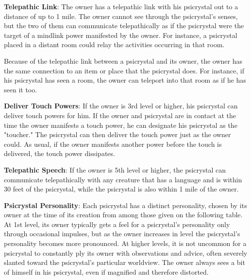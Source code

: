 \textbf{Telepathic Link}: The owner has a telepathic link with his psicrystal out to a distance of up to 1 mile. The owner cannot see through the psicrystal's senses, but the two of them can communicate telepathically as if the psicrystal were the target of a mindlink power manifested by the owner. For instance, a psicrystal placed in a distant room could relay the activities occurring in that room.

Because of the telepathic link between a psicrystal and its owner, the owner has the same connection to an item or place that the psicrystal does. For instance, if his psicrystal has seen a room, the owner can teleport into that room as if he has seen it too.

\textbf{Deliver Touch Powers}: If the owner is 3rd level or higher, his psicrystal can deliver touch powers for him. If the owner and psicrystal are in contact at the time the owner manifests a touch power, he can designate his psicrystal as the "toucher." The psicrystal can then deliver the touch power just as the owner could. As usual, if the owner manifests another power before the touch is delivered, the touch power dissipates.

\textbf{Telepathic Speech}: If the owner is 5th level or higher, the psicrystal can communicate telepathically with any creature that has a language and is within 30 feet of the psicrystal, while the psicrystal is also within 1 mile of the owner.

\textbf{Psicrystal Personality}: Each psicrystal has a distinct personality, chosen by its owner at the time of its creation from among those given on the following table. At 1st level, its owner typically gets a feel for a psicrystal's personality only through occasional impulses, but as the owner increases in level the psicrystal's personality becomes more pronounced. At higher levels, it is not uncommon for a psicrystal to constantly ply its owner with observations and advice, often severely slanted toward the psicrystal's particular worldview. The owner always sees a bit of himself in his psicrystal, even if magnified and therefore distorted.

